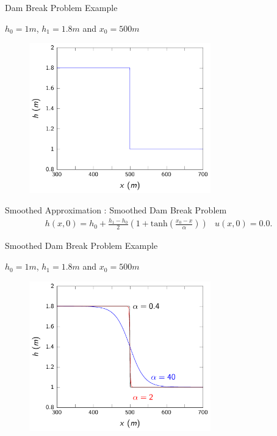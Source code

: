 \documentclass[pdf]{beamer}
\begin{document}
\begin{frame}{Dam Break Problem Example}

$h_0 = 1m$, $h_1 = 1.8m$ and $x_0 = 500m$
	\begin{figure}
		\includegraphics[width=0.7\textwidth]{./Pictures/DSW/DBinit.pdf}
	\end{figure}

\end{frame}

\begin{frame}{Smoothed Approximation : Smoothed Dam Break Problem}
	\begin{subequations}
		\begin{gather*}
		h(x,0) = h_0  + \frac{h_1 - h_0}{2} \left(1 + \text{tanh}\left(\frac{x_0 - x}{\alpha}\right)\right) 
		\end{gather*}
		\begin{gather*}
		u(x,0) = 0.0 .
		\end{gather*}
	\end{subequations} 
	
\end{frame}

\begin{frame}{Smoothed Dam Break Problem Example}
	
	$h_0 = 1m$, $h_1 = 1.8m$ and $x_0 = 500m$
	\begin{figure}
		\includegraphics[width=0.7\textwidth]{./Pictures/DSW/DBSinit.pdf}
	\end{figure}
	
\end{frame}
\end{document}
